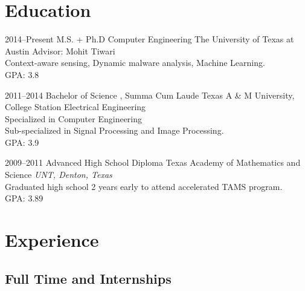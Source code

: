 \documentclass[]{friggeri-cv} %
\begin{document}

\section{Education}

\begin{entrylist}


\entry
{2014--Present}
{M.S. + Ph.D {\normalfont Computer Engineering}}
{The University of Texas at Austin}
{Advisor: Mohit Tiwari \\ Context-aware sensing, Dynamic malware analysis, Machine Learning. \\ GPA: 3.8}


\entry
{2011--2014}
{Bachelor of Science {\normalfont, Summa Cum Laude}}
{Texas A \& M University, College Station}
{Electrical Engineering \\ Specialized in Computer Engineering \\ Sub-specialized in Signal Processing and Image Processing. \\ GPA: 3.9}


\entry
{2009--2011}
{Advanced High School Diploma}
{Texas Academy of Mathematics and Science}
{\emph{UNT, Denton, Texas}
 \\ Graduated high school 2 years early to attend accelerated TAMS program. \\ GPA: 3.89}

\end{entrylist}


\section{Experience}

\subsection{Full Time and Internships}
\end{document}
